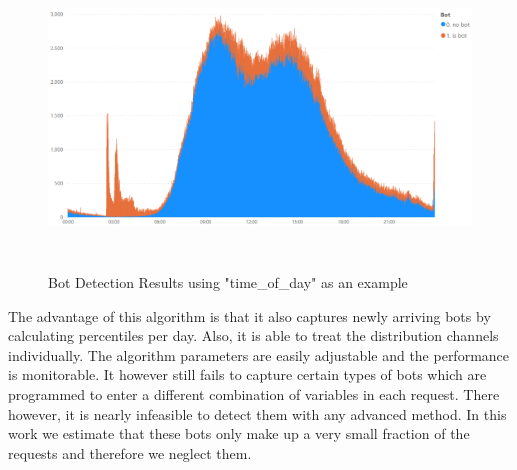\documentclass[12pt,titlepage]{article}
\begin{document}
\begin{figure}[H]
    \centerline{\includegraphics[height=8cm]{bots_day_time.png}}
\caption{Bot Detection Results using "time\_of\_day" as an example}
\label{fig:bots}
\end{figure}
\noindent
The advantage of this algorithm is that it also captures newly arriving bots by calculating percentiles per day. Also, it is able to treat the distribution channels individually. The algorithm parameters are easily adjustable and the performance is monitorable. It however still fails to capture certain types of bots which are programmed to enter a different combination of variables in each request. There however, it is nearly infeasible to detect them with any advanced method. In this work we estimate that these bots only make up a very small fraction of the requests and therefore we neglect them. \\
\end{document}
